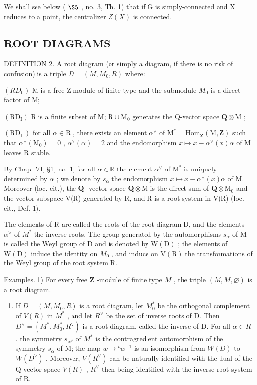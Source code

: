 We shall see below ( \(\S5\) , no. 3, Th. 1) that if G is simply-connected and X reduces to a point, the centralizer \(Z(X)\) is connected.

\subsection{ROOT DIAGRAMS}

DEFINITION 2. A root diagram (or simply a diagram, if there is no risk of confusion) is a triple \(D = (M, M_{0}, R)\) where:

\((RD_{0})\) M is a free Z-module of finite type and the submodule \(M_{0}\) is a direct factor of M;

\((\mathrm{RD}_{\mathrm{I}})\) R is a finite subset of M; \(\mathrm{R} \cup \mathrm{M}_0\) generates the Q-vector space \(\mathbf{Q} \otimes \mathrm{M}\) ;

\((\mathrm{RD}_{\mathrm{II}})\) for all \(\alpha \in \mathrm{R}\) , there exists an element \(\alpha^{\vee}\) of \(\mathrm{M}^{*} = \mathrm{Hom}_{\mathbf{Z}}(\mathrm{M}, \mathbf{Z})\) such that \(\alpha^{\vee}(\mathrm{M}_{0}) = 0\) , \(\alpha^{\vee}(\alpha) = 2\) and the endomorphism \(x \mapsto x - \alpha^{\vee}(x)\alpha\) of M leaves R stable.

By Chap. VI, §1, no. 1, for all \(\alpha \in \mathbb{R}\) the element \(\alpha^{\vee}\) of \(\mathrm{M}^*\) is uniquely determined by \(\alpha\) ; we denote by \(s_{\alpha}\) the endomorphism \(x \mapsto x - \alpha^{\vee}(x)\alpha\) of M. Moreover (loc. cit.), the \(\mathbf{Q}\) -vector space \(\mathbf{Q} \otimes \mathrm{M}\) is the direct sum of \(\mathbf{Q} \otimes \mathrm{M}_0\) and the vector subspace V(R) generated by R, and R is a root system in V(R) (loc. cit., Def. 1).

The elements of R are called the roots of the root diagram D, and the elements \(\alpha^{\vee}\) of \(M^{*}\) the inverse roots. The group generated by the automorphisms \(s_{\alpha}\) of M is called the Weyl group of D and is denoted by \(\mathrm{W(D)}\) ; the elements of \(\mathrm{W(D)}\) induce the identity on \(M_{0}\) , and induce on \(\mathrm{V(R)}\) the transformations of the Weyl group of the root system R.

Examples. 1) For every free \(\mathbf{Z}\) -module of finite type \(M\) , the triple \((M, M, \varnothing)\) is a root diagram.

\begin{enumerate}
\def\labelenumi{\arabic{enumi})}
\setcounter{enumi}{1}
\tightlist
\item
  If \(D = (M, M_{0}, R)\) is a root diagram, let \(M_{0}^{*}\) be the orthogonal complement of \(V(R)\) in \(M^{*}\) , and let \(R^{\vee}\) be the set of inverse roots of D. Then \(D^{\vee} = (M^{*}, M_{0}^{*}, R^{\vee})\) is a root diagram, called the inverse of D. For all \(\alpha \in R\) , the symmetry \(s_{\alpha^{\vee}}\) of \(M^{*}\) is the contragredient automorphism of the symmetry \(s_{\alpha}\) of M; the map \(w \mapsto {}^{t} w^{-1}\) is an isomorphism from \(W(D)\) to \(W(D^{\vee})\) . Moreover, \(V(R^{\vee})\) can be naturally identified with the dual of the Q-vector space \(V(R)\) , \(R^{\vee}\) then being identified with the inverse root system of R.
\end{enumerate}

